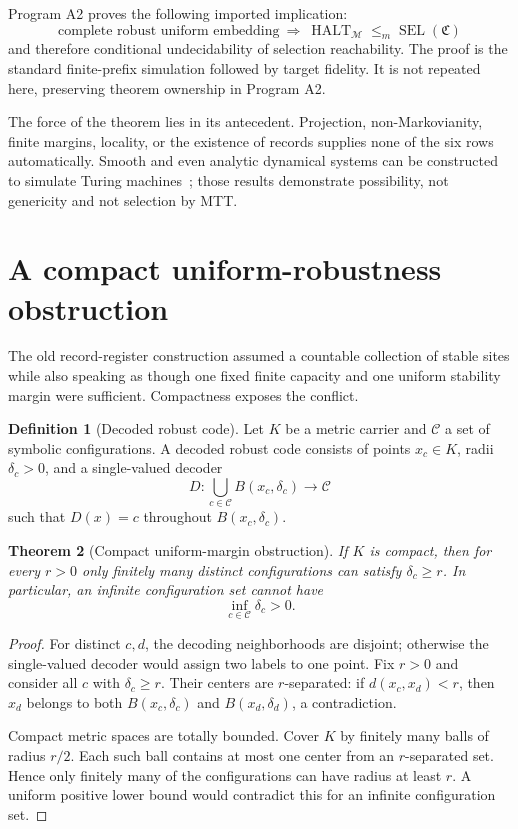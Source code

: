 \documentclass[11pt]{article}
\newtheorem{theorem}{Theorem}[section]
\theoremstyle{definition}
\newtheorem{definition}[theorem]{Definition}
\theoremstyle{remark}
\newcommand{\SEL}{\operatorname{SEL}}
\begin{document}
Program A2 proves the following imported implication:
\[
\boxed{
\text{complete robust uniform embedding}
\ \Longrightarrow\
\operatorname{HALT}_{\mathcal M}\leq_m\SEL(\mathfrak C)
}
\]
and therefore conditional undecidability of selection reachability.  The
proof is the standard finite-prefix simulation followed by target fidelity.
It is not repeated here, preserving theorem ownership in Program A2.

The force of the theorem lies in its antecedent.  Projection, non-Markovianity,
finite margins, locality, or the existence of records supplies none of the six
rows automatically.  Smooth and even analytic dynamical systems can be
constructed to simulate Turing machines~\cite{Branicky1995,GracaEtAl2005,
GracaEtAl2008,GracaZhong2023}; those results demonstrate possibility, not
genericity and not selection by MTT.

\section{A compact uniform-robustness obstruction}

The old record-register construction assumed a countable collection of stable
sites while also speaking as though one fixed finite capacity and one uniform
stability margin were sufficient.  Compactness exposes the conflict.

\begin{definition}[Decoded robust code]
Let \(K\) be a metric carrier and \(\mathcal C\) a set of symbolic
configurations.  A decoded robust code consists of points \(x_c\in K\),
radii \(\delta_c>0\), and a single-valued decoder
\[
 D:\bigcup_{c\in\mathcal C}B(x_c,\delta_c)\longrightarrow\mathcal C
\]
such that \(D(x)=c\) throughout \(B(x_c,\delta_c)\).
\end{definition}

\begin{theorem}[Compact uniform-margin obstruction]\label{thm:packing}
If \(K\) is compact, then for every \(r>0\) only finitely many distinct
configurations can satisfy \(\delta_c\geq r\).  In particular, an infinite
configuration set cannot have
\[
 \inf_{c\in\mathcal C}\delta_c>0.
\]
\end{theorem}

\begin{proof}
For distinct \(c,d\), the decoding neighborhoods are disjoint; otherwise the
single-valued decoder would assign two labels to one point.  Fix \(r>0\) and
consider all \(c\) with \(\delta_c\geq r\).  Their centers are \(r\)-separated:
if \(d(x_c,x_d)<r\), then \(x_d\) belongs to both
\(B(x_c,\delta_c)\) and \(B(x_d,\delta_d)\), a contradiction.

Compact metric spaces are totally bounded.  Cover \(K\) by finitely many balls
of radius \(r/2\).  Each such ball contains at most one center from an
\(r\)-separated set.  Hence only finitely many of the configurations can have
radius at least \(r\).  A uniform positive lower bound would contradict this
for an infinite configuration set.
\end{proof}
\end{document}

